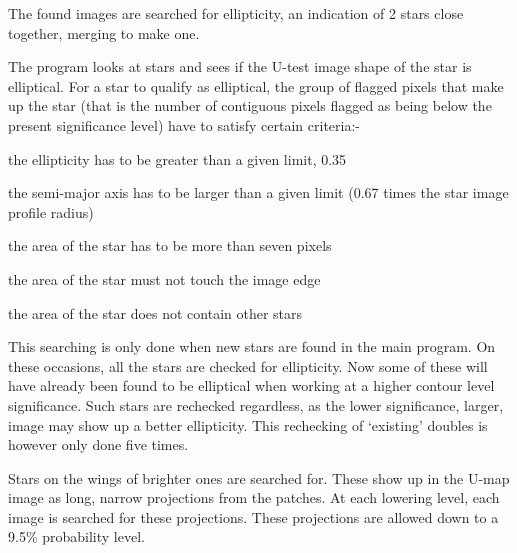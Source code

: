 \begin{small}
{{ \vspace*{1mm}
 \hspace*{2em}{\bf Ellipticity}
 \vspace*{1mm}
 
 
 The found images are searched for ellipticity, an indication of 2
 stars close together, merging to make one.
 
 The program looks at stars and sees if the U-test image shape of the
 star is elliptical. For a star to qualify as elliptical, the
 group of flagged pixels that make up the star (that is the number
 of contiguous pixels flagged as being below the present
 significance level) have to satisfy certain criteria:-
 
\begin{list}{{-}}{}
 
    \item  the ellipticity has to be greater than a given limit, 0.35
    \item  the semi-major axis has to be larger than a given limit
              (0.67 times the star image profile radius)
    \item  the area of the star has to be more than seven pixels
    \item  the area of the star must not touch the image edge
    \item  the area of the star does not contain other stars
\end{list}
 
 This searching is only done when new stars are found in the main
 program. On these occasions, all the stars are checked for
 ellipticity. Now some of these will have already been found
 to be elliptical when working at a higher contour level
 significance. Such stars are rechecked regardless, as the lower
 significance, larger, image may show up a better ellipticity. This
 rechecking of `existing' doubles is however only done five times.
 
 \vspace*{1mm}
 \hspace*{2em}{\bf Shoulders}
 \vspace*{1mm}
 
  Stars on the wings of brighter ones are searched for. These show up
  in the U-map image as long, narrow projections from the patches. At
  each lowering level, each image is searched for these projections.
  These projections are allowed down to a 9.5\% probability level.
 
 \vspace*{1mm}
 \hspace*{2em}{\bf Weeding}
 \vspace*{1mm}
 
}}
\end{small}
